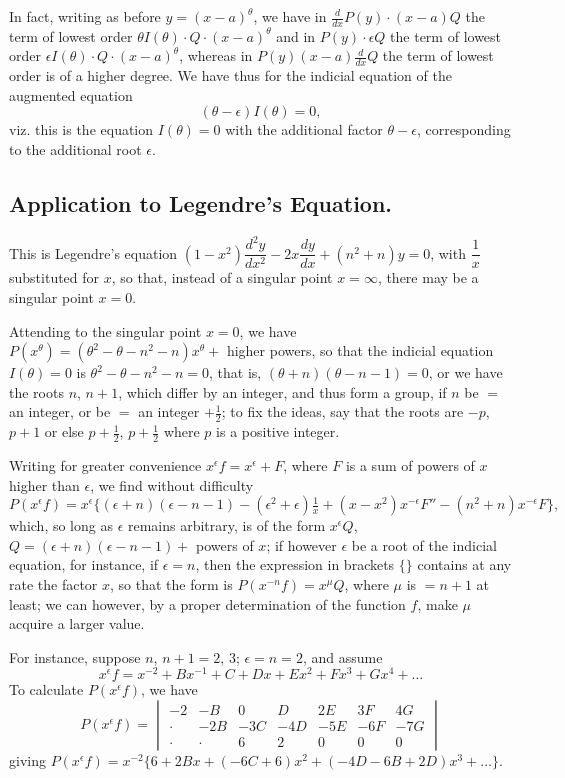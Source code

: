 \documentclass[11pt,a4paper]{article}
\theoremstyle{definition}
\begin{document}
In fact, writing as before $y = (x - a)^\theta$, we have in $\tfrac{d}{dx}P(y) \cdot (x - a)Q$ the term of lowest order $\theta I(\theta) \cdot Q \cdot (x - a)^\theta$ and in $P(y) \cdot \epsilon Q$ the term of lowest order $\epsilon I(\theta) \cdot Q \cdot (x - a)^\theta$, whereas in $P(y)(x - a)\tfrac{d}{dx}Q$ the term of lowest order is of a higher degree. We have thus for the indicial equation of the augmented equation
\[
(\theta - \epsilon)I(\theta) = 0,
\]
viz. this is the equation $I(\theta) = 0$ with the additional factor $\theta - \epsilon$, corresponding to the additional root $\epsilon$.

\subsection*{Application to Legendre's Equation.}

This is Legendre's equation $(1 - x^2)\dfrac{d^2y}{dx^2} - 2x\dfrac{dy}{dx} + (n^2 + n)y = 0$, with $\dfrac{1}{x}$ substituted for $x$, so that, instead of a singular point $x = \infty$, there may be a singular point $x = 0$.

Attending to the singular point $x = 0$, we have $P(x^\theta) = (\theta^2 - \theta - n^2 - n)x^\theta +$ higher powers, so that the indicial equation $I(\theta) = 0$ is $\theta^2 - \theta - n^2 - n = 0$, that is, $(\theta + n)(\theta - n - 1) = 0$, or we have the roots $n$, $n + 1$, which differ by an integer, and thus form a group, if $n$ be $=$ an integer, or be $=$ an integer $+ \tfrac{1}{2}$; to fix the ideas, say that the roots are $-p$, $p + 1$ or else $p + \tfrac{1}{2}$, $p + \tfrac{1}{2}$ where $p$ is a positive integer.

Writing for greater convenience $x^\epsilon f = x^\epsilon + F$, where $F$ is a sum of powers of $x$ higher than $\epsilon$, we find without difficulty
\[
P(x^\epsilon f) = x^\epsilon\{(\epsilon + n)(\epsilon - n - 1) - (\epsilon^2 + \epsilon)\tfrac{1}{x} + (x - x^2)x^{-\epsilon}F'' - (n^2 + n)x^{-\epsilon}F\},
\]
which, so long as $\epsilon$ remains arbitrary, is of the form $x^\epsilon Q$, $Q = (\epsilon + n)(\epsilon - n - 1) +$ powers of $x$; if however $\epsilon$ be a root of the indicial equation, for instance, if $\epsilon = n$, then the expression in brackets $\{\}$ contains at any rate the factor $x$, so that the form is $P(x^{-n}f) = x^\mu Q$, where $\mu$ is $= n + 1$ at least; we can however, by a proper determination of the function $f$, make $\mu$ acquire a larger value.

For instance, suppose $n$, $n + 1 = 2$, $3$; $\epsilon = n = 2$, and assume
\[
x^\epsilon f = x^{-2} + Bx^{-1} + C + Dx + Ex^2 + Fx^3 + Gx^4 + \ldots
\]
To calculate $P(x^\epsilon f)$, we have
\[
P(x^\epsilon f) = \begin{vmatrix}
-2 & -B & 0 & D & 2E & 3F & 4G \\
\cdot & -2B & -3C & -4D & -5E & -6F & -7G \\
\cdot & \cdot & 6 & 2 & 0 & 0 & 0
\end{vmatrix}
\]
giving $P(x^\epsilon f) = x^{-2}\{6 + 2Bx + (-6C + 6)x^2 + (-4D - 6B + 2D)x^3 + \ldots\}$.
\end{document}
